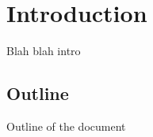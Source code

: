 \chapter{Introduction}

Blah blah intro

\nlipsum

\section{Outline}
Outline of the document

\nlipsum

\begin{comment}
In the world of biomolecular science, molecular simulations are gaining in importance. In order to run these simulations, a set of parameters is needed, including the atomic partial charges of a molecule. Calculating these charges, however, can take a lot of time, even on advanced computation clusters.

As it is seemingly impossible to speed up the partial charge calculations, an alternative way to retrieve them should be developed. It is known that similar fragments in two different molecules often have roughly the same atomic charges. Therefore, it should be possible to assign the charges of a molecule based on the known charges of fragments of other molecules. It is expected that humans (read: experienced scientists) will be able to find the best matches out of a set of possible ones. Therefore, a tool needs to be designed that allows them to parameterise a molecule based on a set of related fragments of other molecules.

In this research project, such tool will be designed. Two slightly different prototypes of the tool will be implemented and compared to see which of these has the best interaction design for the task at hand. Furthermore, it will be evaluated whether such tool can truly improve the parameterisation process of molecules. Overall, the project aims to answer the following research questions:
\begin{itemize}
\item What is the best way for chemists to interact with a tool for assigning atomic charges based on those of similar fragments in other molecules?
\item Is it feasible to do manual partial charge assignment in a reasonable amount of time?
\item Compared to computed partial charges, how well can manual atomic charge assignment be done?
\end{itemize}
\end{comment}